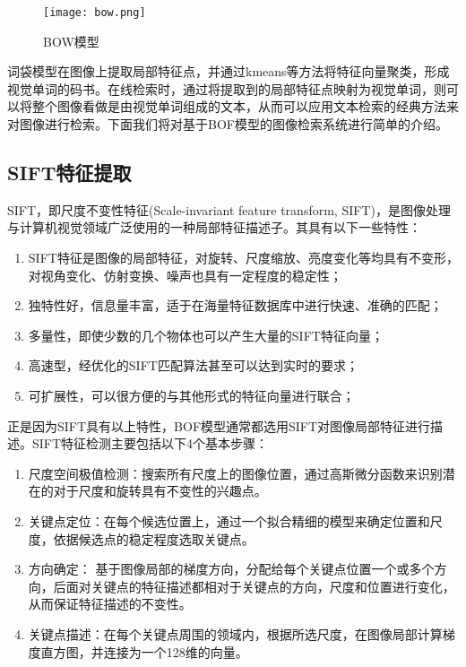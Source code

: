 \begin{figure}
\centering
\texttt{[image: bow.png]}
\caption{BOW模型}
\end{figure}

词袋模型在图像上提取局部特征点，并通过kmeans等方法将特征向量聚类，形成视觉单词的码书。在线检索时，通过将提取到的局部特征点映射为视觉单词，则可以将整个图像看做是由视觉单词组成的文本，从而可以应用文本检索的经典方法来对图像进行检索。下面我们将对基于BOF模型的图像检索系统进行简单的介绍。


\subsection{SIFT特征提取}
SIFT，即尺度不变性特征(Scale-invariant feature transform, SIFT)，是图像处理与计算机视觉领域广泛使用的一种局部特征描述子\cite{lowe2004distinctive}。其具有以下一些特性：
\begin{enumerate}
\item SIFT特征是图像的局部特征，对旋转、尺度缩放、亮度变化等均具有不变形，对视角变化、仿射变换、噪声也具有一定程度的稳定性；
\item 独特性好，信息量丰富，适于在海量特征数据库中进行快速、准确的匹配；
\item 多量性，即使少数的几个物体也可以产生大量的SIFT特征向量；
\item 高速型，经优化的SIFT匹配算法甚至可以达到实时的要求；
\item 可扩展性，可以很方便的与其他形式的特征向量进行联合；
\end{enumerate}
正是因为SIFT具有以上特性，BOF模型通常都选用SIFT对图像局部特征进行描述。SIFT特征检测主要包括以下4个基本步骤：
\begin{enumerate}
\item 尺度空间极值检测：搜索所有尺度上的图像位置，通过高斯微分函数来识别潜在的对于尺度和旋转具有不变性的兴趣点。
\item 关键点定位：在每个候选位置上，通过一个拟合精细的模型来确定位置和尺度，依据候选点的稳定程度选取关键点。
\item 方向确定： 基于图像局部的梯度方向，分配给每个关键点位置一个或多个方向，后面对关键点的特征描述都相对于关键点的方向，尺度和位置进行变化，从而保证特征描述的不变性。
\item 关键点描述：在每个关键点周围的领域内，根据所选尺度，在图像局部计算梯度直方图，并连接为一个128维的向量。
\end{enumerate}

